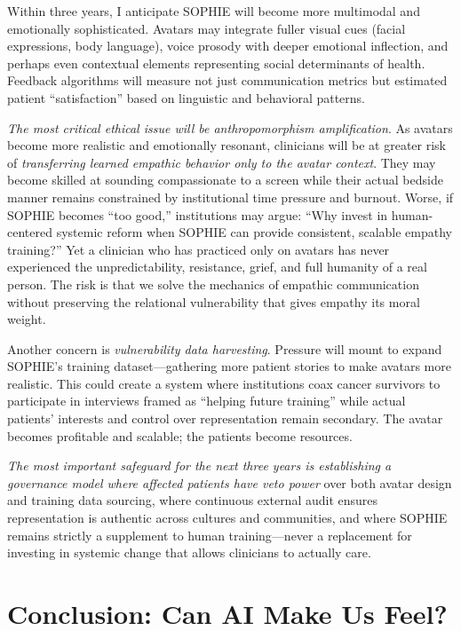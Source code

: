 \documentclass[12pt,twoside]{article}
\begin{document}
Within three years, I anticipate SOPHIE will become more multimodal and emotionally sophisticated. Avatars may integrate fuller visual cues (facial expressions, body language), voice prosody with deeper emotional inflection, and perhaps even contextual elements representing social determinants of health. Feedback algorithms will measure not just communication metrics but estimated patient \enquote{satisfaction} based on linguistic and behavioral patterns.

\emph{The most critical ethical issue will be anthropomorphism amplification}. As avatars become more realistic and emotionally resonant, clinicians will be at greater risk of \emph{transferring learned empathic behavior only to the avatar context}. They may become skilled at sounding compassionate to a screen while their actual bedside manner remains constrained by institutional time pressure and burnout. Worse, if SOPHIE becomes \enquote{too good,} institutions may argue: \enquote{Why invest in human-centered systemic reform when SOPHIE can provide consistent, scalable empathy training?} Yet a clinician who has practiced only on avatars has never experienced the unpredictability, resistance, grief, and full humanity of a real person. The risk is that we solve the mechanics of empathic communication without preserving the relational vulnerability that gives empathy its moral weight.

Another concern is \emph{vulnerability data harvesting}. Pressure will mount to expand SOPHIE's training dataset—gathering more patient stories to make avatars more realistic. This could create a system where institutions coax cancer survivors to participate in interviews framed as \enquote{helping future training} while actual patients' interests and control over representation remain secondary. The avatar becomes profitable and scalable; the patients become resources.

\emph{The most important safeguard for the next three years is establishing a governance model where affected patients have veto power} over both avatar design and training data sourcing, where continuous external audit ensures representation is authentic across cultures and communities, and where SOPHIE remains strictly a supplement to human training—never a replacement for investing in systemic change that allows clinicians to actually care.

\section*{Conclusion: Can AI Make Us Feel?}
\end{document}
